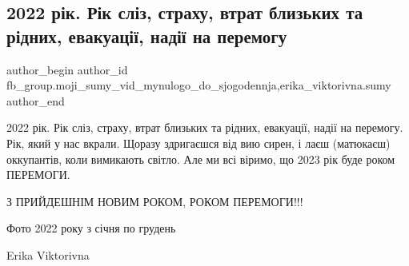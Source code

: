 
 
 
 
 
 
\subsection{2022 рік. Рік сліз, страху, втрат близьких та рідних, евакуації, надії на перемогу}
\label{sec:30_12_2022.fb.fb_group.moji_sumy_vid_mynulogo_do_sjogodennja.1.2022_rik}
 
\ifcmt
 author_begin
   author_id fb_group.moji_sumy_vid_mynulogo_do_sjogodennja,erika_viktorivna.sumy
 author_end
\fi

2022 рік. Рік сліз, страху, втрат близьких та рідних, евакуації, надії на
перемогу. Рік, який у нас вкрали. Щоразу здригаєшся від вию сирен, і лаєш
(матюкаєш) оккупантів, коли вимикають світло. Але ми всі віримо, що 2023 рік
буде роком ПЕРЕМОГИ.

З ПРИЙДЕШНІМ НОВИМ РОКОМ, РОКОМ ПЕРЕМОГИ!!!

Фото 2022 року з січня по грудень

Erika Viktorivna
